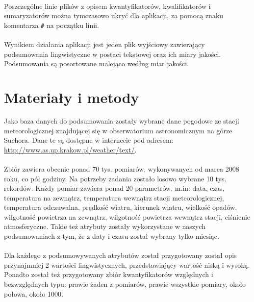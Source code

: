 \documentclass{classrep}
\begin{document}
\paragraph{}
Poszczególne linie plików z opisem kwantyfikatorów, kwalifikatorów i sumaryzatorów można tymczasowo ukryć dla aplikacji, za pomocą znaku komentarza \verb|#| na początku linii.

\paragraph{}
Wynikiem działania aplikacji jest jeden plik wyjściowy zawierający podsumowania lingwistyczne w postaci tekstowej oraz ich miary jakości. Podsumowania są posortowane malejąco według miar jakości.

\section{Materiały i metody}
Jako baza danych do podsumowania zostały wybrane dane pogodowe ze stacji meteorologicznej znajdującej się w obserwatorium astronomicznym na górze Suchora. Dane te są dostępne w internecie pod adresem:
\url{http://www.as.up.krakow.pl/weather/text/}.

\paragraph{}
Zbiór zawiera obecnie ponad 70 tys. pomiarów, wykonywanych od marca 2008 roku, co pół godziny. Na potrzeby zadania zostało losowo wybrane 10 tys. rekordów.
Każdy pomiar zawiera ponad 20 parametrów, m.in: data, czas, temperatura na zewnątrz, temperatura wewnątrz stacji meteorologicznej, temperatura odczuwalna, prędkość wiatru, kierunek wiatru, wielkość opadów, wilgotność powietrza na zewnątrz, wilgotność powietrza wewnątrz stacji, ciśnienie atmosferyczne. Takie też atrybuty zostały wykorzystane w naszych podsumowaniach z tym, że z daty i czasu został wybrany tylko miesiąc.

\paragraph{}
Dla każdego z podsumowywanych atrybutów został przygotowany został opis przynajmniej 2 wartości lingwistycznych, przedstawiający wartość niską i wysoką. Ponadto został też przygotowany zbiór kwantyfikatorów względnych i bezwzględnych typu: prawie żaden z pomiarów, prawie wszystkie pomiary, około połowa, około 1000.
\end{document}
